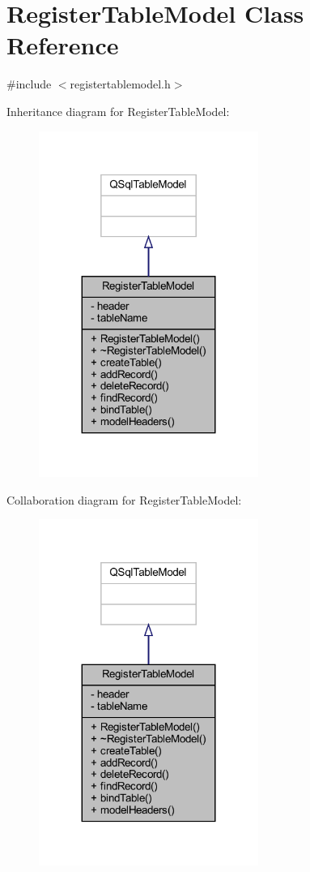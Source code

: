 \hypertarget{class_register_table_model}{}\section{Register\+Table\+Model Class Reference}
\label{class_register_table_model}


{\ttfamily \#include $<$registertablemodel.\+h$>$}



Inheritance diagram for Register\+Table\+Model\+:
\nopagebreak
\begin{figure}[H]
\begin{center}
\leavevmode
\includegraphics[width=203pt]{class_register_table_model__inherit__graph}
\end{center}
\end{figure}


Collaboration diagram for Register\+Table\+Model\+:
\nopagebreak
\begin{figure}[H]
\begin{center}
\leavevmode
\includegraphics[width=203pt]{class_register_table_model__coll__graph}
\end{center}
\end{figure}
